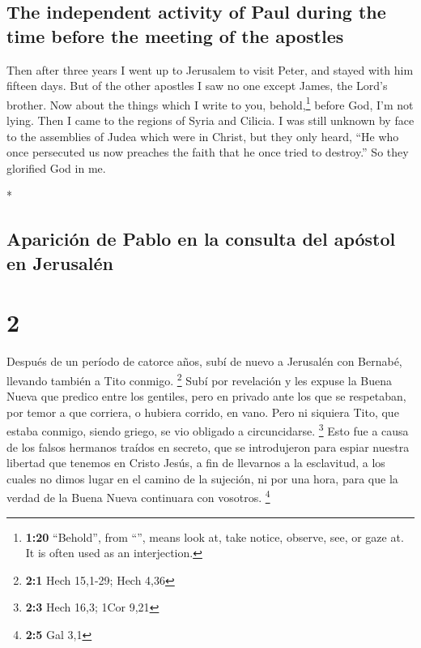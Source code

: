 \begin{paracol}{2}
\begin{otherlanguage}{english}
\hypertarget{the-independent-activity-of-paul-during-the-time-before-the-meeting-of-the-apostles}{%
\subsection{The independent activity of Paul during the time before the
meeting of the
apostles}\label{the-independent-activity-of-paul-during-the-time-before-the-meeting-of-the-apostles}}

 Then after three years I went up to Jerusalem to visit
Peter, and stayed with him fifteen days.  But of the
other apostles I saw no one except James, the Lord's brother.
 Now about the things which I write to you,
behold,\footnote{\textbf{1:20} ``Behold'', from ``'', means
  look at, take notice, observe, see, or gaze at. It is often used as an
  interjection.} before God, I'm not lying.  Then I came
to the regions of Syria and Cilicia.  I was still unknown
by face to the assemblies of Judea which were in Christ, 
but they only heard, ``He who once persecuted us now preaches the faith
that he once tried to destroy.''  So they glorified God
in me.

\end{otherlanguage}

\switchcolumn[0]*

\hypertarget{apariciuxf3n-de-pablo-en-la-consulta-del-apuxf3stol-en-jerusaluxe9n}{%
\subsection{Aparición de Pablo en la consulta del apóstol en
Jerusalén}\label{apariciuxf3n-de-pablo-en-la-consulta-del-apuxf3stol-en-jerusaluxe9n}}

\hypertarget{section-2}{%
\section{2}\label{section-2}}

 Después de un período de catorce años, subí de nuevo a
Jerusalén con Bernabé, llevando también a Tito conmigo. \footnote{\textbf{2:1}
  Hech 15,1-29; Hech 4,36}  Subí por revelación y les
expuse la Buena Nueva que predico entre los gentiles, pero en privado
ante los que se respetaban, por temor a que corriera, o hubiera corrido,
en vano.  Pero ni siquiera Tito, que estaba conmigo,
siendo griego, se vio obligado a circuncidarse. \footnote{\textbf{2:3}
  Hech 16,3; 1Cor 9,21}  Esto fue a causa de los falsos
hermanos traídos en secreto, que se introdujeron para espiar nuestra
libertad que tenemos en Cristo Jesús, a fin de llevarnos a la
esclavitud,  a los cuales no dimos lugar en el camino de
la sujeción, ni por una hora, para que la verdad de la Buena Nueva
continuara con vosotros. \footnote{\textbf{2:5} Gal 3,1}


\end{paracol}
